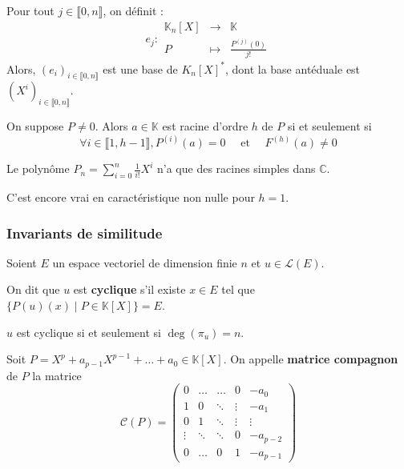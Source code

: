   \begin{application}
    Pour tout $j \in \llbracket 0, n \rrbracket$, on définit :
    \[
    e_j : \begin{array}{ccc}
      \mathbb{K}_n[X] &\rightarrow& \mathbb{K} \\
      P &\mapsto& \frac{P^{(j)}(0)}{j!}
    \end{array}
    \]
    Alors, $(e_i)_{i \in \llbracket 0, n \rrbracket}$ est une base de $K_n[X]^*$, dont la base antéduale est $(X^i)_{i \in \llbracket 0, n \rrbracket}$.
  \end{application}


  \begin{corollary}
    On suppose $P \neq 0$. Alors $a \in \mathbb{K}$ est racine d'ordre $h$ de $P$ si et seulement si
    \[ \forall i \in \llbracket 1, h-1 \rrbracket, P^{(i)}(a) = 0 \quad \text{ et } \quad F^{(h)}(a) \neq 0 \]
  \end{corollary}

  \begin{example}
    Le polynôme $P_n = \sum_{i=0}^{n} \frac{1}{i!} X^{i}$ n'a que des racines simples dans $\mathbb{C}$.
  \end{example}

  \begin{remark}
    C'est encore vrai en caractéristique non nulle pour $h = 1$.
  \end{remark}

  \subsubsection{Invariants de similitude}


  Soient $E$ un espace vectoriel de dimension finie $n$ et $u \in \mathcal{L}(E)$.

  \begin{definition}
    On dit que $u$ est \textbf{cyclique} s'il existe $x \in E$ tel que $\{ P(u)(x) \mid P \in \mathbb{K}[X] \} = E$.
  \end{definition}

  \begin{proposition}
    $u$ est cyclique si et seulement si $\deg(\pi_u) = n$.
  \end{proposition}

  \begin{definition}
    Soit $P = X^p + a_{p-1} X^{p-1} + \dots + a_0 \in \mathbb{K}[X]$. On appelle \textbf{matrice compagnon} de $P$ la matrice
    \[ \mathcal{C}(P) = \begin{pmatrix} 0 & \dots & \dots & 0 & -a_0 \\ 1 & 0 & \ddots & \vdots & -a_1 \\ 0 & 1 & \ddots & \vdots & \vdots \\ \vdots & \ddots & \ddots & 0 & -a_{p-2} \\ 0 & \dots & 0 & 1 & -a_{p-1} \end{pmatrix} \]
  \end{definition}

